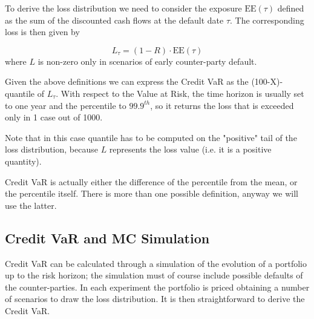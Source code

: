 To derive the loss distribution we need to consider the exposure $\textrm{EE}(\tau)$ defined as the sum of the discounted cash flows at the default date $\tau$. The corresponding loss is then given by

\begin{equation}
L_{\tau} = (1 - R) \cdot \textrm{EE}(\tau)
\end{equation}
where $L$ is non-zero only in scenarios of early counter-party default. 

Given the above definitions we can express the Credit VaR as the (100-X)-quantile of $L_{\tau}$. With respect to the Value at Risk, the time horizon is usually set to one year and the percentile to $99.9^{th}$, so it returns the loss that is exceeded only in 1 case out of 1000. 

Note that in this case quantile has to be computed on the "positive" tail of the loss distribution, because $L$ represents the loss value (i.e. it is a positive quantity).

Credit VaR is actually either the difference of the percentile from the mean, or the percentile itself. There is more than one possible definition, anyway we  will use the latter.

%

\subsection{Credit VaR and MC Simulation}
\label{sec:credit-var-sim}
Credit VaR can be calculated through a simulation of the evolution of a portfolio up to the risk horizon; the simulation must of course include possible defaults of the counter-parties. 
In each experiment the portfolio is priced obtaining a number of scenarios to draw the loss distribution. It is then straightforward to derive the Credit VaR.

